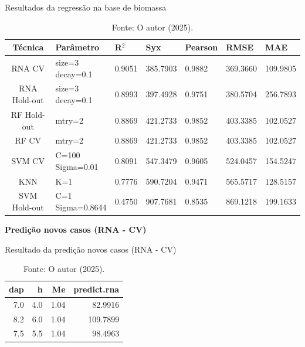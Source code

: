 \begin{table}[H]
\caption{Resultados da regressão na base de biomassa}
\hspace*{-1.5cm} 
\begin{minipage}{\textwidth}
\centering
{\renewcommand{\arraystretch}{1.7} %

\begin{tabular}{|c|p{3cm}|p{2cm}|p{2cm}|p{2cm}|p{2cm}|p{2cm}|}
\hline
\textbf{Técnica} & \textbf{Parâmetro} & \textbf{R$^2$} & \textbf{Syx} & \textbf{Pearson} & \textbf{RMSE} & \textbf{MAE} \\
\hline
\colorbox[HTML]{CAF2C2}{RNA CV} & \makecell[l]{size=3\\decay=0.1} & \colorbox[HTML]{CAF2C2}{0.9051} & \colorbox[HTML]{CAF2C2}{385.7903} & \colorbox[HTML]{CAF2C2}{0.9882} & \colorbox[HTML]{CAF2C2}{369.3660} & 109.9805 \\
\hline
RNA Hold-out & \makecell[l]{size=3\\decay=0.1} & 0.8993 & 397.4928 & 0.9751 & 380.5704 & 256.7893 \\
\hline
RF Hold-out & mtry=2 & 0.8869 & 421.2733 & 0.9852 & 403.3385 & \colorbox[HTML]{CAF2C2}{102.0527} \\
\hline
RF CV & mtry=2 & 0.8869 & 421.2733 & 0.9852 & 403.3385 & \colorbox[HTML]{CAF2C2}{102.0527} \\
\hline
SVM CV & \makecell[l]{C=100\\Sigma=0.01} & 0.8091 & 547.3479 & 0.9605 & 524.0457 & 154.5247 \\
\hline
KNN & K=1 & 0.7776 & 590.7204 & 0.9471 & 565.5717 & 128.5157 \\
\hline
SVM Hold-out & \makecell[l]{C=1\\Sigma=0.8644} & 0.4750 & 907.7681 & 0.8535 & 869.1218 & 199.1633 \\
\hline
\end{tabular}
}
\end{minipage}
\caption*{Fonte: O autor (2025).}
\end{table}



\begin{center}
    \textbf{Predição novos casos (RNA - CV)}
\end{center}

\begin{table}[H]
\centering
\caption{Resultado da predição novos casos (RNA - CV)}
\begin{tabular}{|r|r|r|r|}
\hline
dap & h & Me & predict.rna \\
\hline
7.0 & 4.0 & 1.04 & 82.9916 \\
\hline
8.2 & 6.0 & 1.04 & 109.7899 \\
\hline
7.5 & 5.5 & 1.04 & 98.4963 \\
\hline
\end{tabular}
\caption*{Fonte: O autor (2025).}
\end{table}


